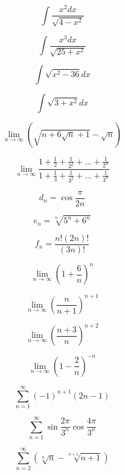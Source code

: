 \documentclass[10pt,a4paper]{article}
\begin{document}
$$
\int \frac{x^2dx}{\sqrt{4-x^2}}
$$

$$
\int \frac{x^3dx}{\sqrt{25+x^2}}
$$

$$
\int \sqrt{x^2 -36}dx
$$

$$
\int \sqrt{3+x^2}dx
$$

$$
\lim_{n\to\infty}\left( \sqrt{n+6\sqrt{n}+1} - \sqrt{n} \right)
$$


$$
\lim_{n\to\infty} \frac{1 + \frac{1}{2} + \frac{1}{2^2} + \ldots + \frac{1}{2^n} }{1 + \frac{1}{3} + \frac{1}{3^2} + \ldots + \frac{1}{3^n}}
$$


$$
d_n = \cos\frac{\pi}{2n}
$$

$$
e_n = \sqrt[n]{5^n + 6^n}
$$

$$
f_n = \frac{n!(2n)!}{(3n)!}
$$

$$
\lim_{n\to\infty} \left ( 1+\frac{6}{n} \right )^n
$$

$$
\lim_{n\to\infty} \left ( \frac{n}{n+1} \right )^{n+1}
$$


$$
\lim_{n\to\infty} \left ( \frac{n+3}{n} \right )^{n+2}
$$ 

$$
\lim_{n\to\infty} \left ( 1 - \frac{2}{n} \right )^{-n}
$$

$$
\sum_{n=1}^{\infty} (-1)^{n+1}(2n-1)
$$

$$
\sum_{n=1}^{\infty} \sin  \frac{2\pi}{3^n} \cos \frac{4\pi}{3^n}
$$


$$
\sum_{n=2}^{\infty} (\sqrt[n]{n} - \sqrt[n+1]{n+1})
$$
\end{document}
